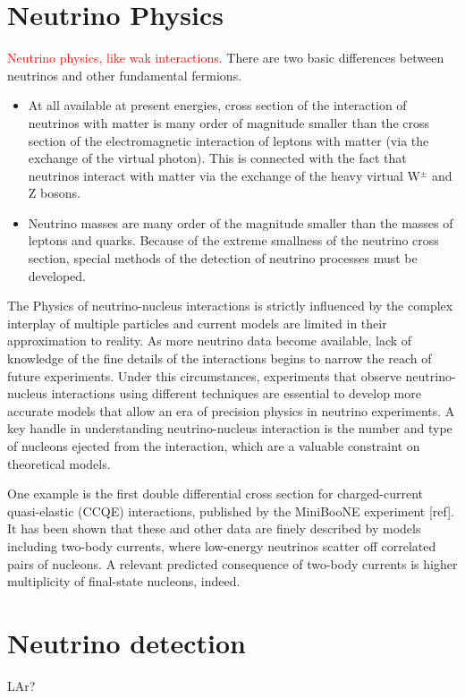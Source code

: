 \section{Neutrino Physics}
\textcolor{red}{Neutrino physics, like wak interactions.}
\label{sec:1.1}
There are two basic differences between neutrinos and other fundamental fermions.
\begin{itemize}
  \item At all available at present energies, cross section of the interaction of neutrinos %
    with matter is many order of magnitude smaller than the cross section of the %
    electromagnetic interaction of leptons with matter (via the exchange of the virtual %
    photon).
    This is connected with the fact that neutrinos interact with matter via %
    the exchange of the heavy virtual W$^\pm$ and Z bosons.
  \item Neutrino masses are many order of the magnitude smaller than the masses of %
    leptons and quarks.
    Because of the extreme smallness of the neutrino cross section, special methods %
    of the detection of neutrino processes must be developed.
\end{itemize}

The Physics of neutrino-nucleus interactions is strictly influenced by the complex interplay %
of multiple particles and current models are limited in their approximation to reality.
As more neutrino data become available, lack of knowledge of the fine details of the %
interactions begins to narrow the reach of future experiments.
Under this circumstances, experiments that observe neutrino-nucleus interactions using %
different techniques are essential to develop more accurate models that allow an era of %
precision physics in neutrino experiments.
A key handle in understanding neutrino-nucleus interaction is the number and type of nucleons
ejected from the interaction, which are a valuable constraint on theoretical models.

One example is the first double differential cross section for charged-current quasi-elastic %
(CCQE) interactions, published by the MiniBooNE experiment [ref].
It has been shown that these and other data are finely described by models including %
two-body currents, where low-energy neutrinos scatter off correlated pairs of nucleons.
A relevant predicted consequence of two-body currents is higher multiplicity of %
final-state nucleons, indeed.

\section{Neutrino detection}
\label{sec:1.3}
LAr?

